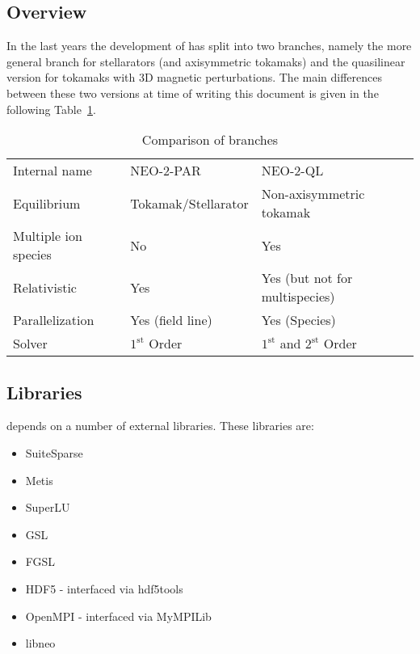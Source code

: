 \documentclass{article}
\newcommand{\vv}[1]{\texttt{\detokenize{#1}}}
\begin{document}
\subsection{Overview}
In the last years the development of \vv{NEO-2} has split into two branches,
namely the more general branch for stellarators (and axisymmetric
tokamaks) and the quasilinear version for tokamaks with 3D magnetic
perturbations. The main differences between these two versions at time
of writing this document is given in the following Table~\ref{tab:neo2branches}.

\begin{table}[h]
\centering
\begin{tabular}{lll}
Internal name   & NEO-2-PAR & NEO-2-QL\\
Equilibrium     & Tokamak/Stellarator & Non-axisymmetric tokamak\\
Multiple ion species & No & Yes\\
Relativistic    & Yes & Yes (but not for multispecies)\\
Parallelization & Yes (field line) & Yes (Species)\\
Solver          & $1^\mathrm{st}$ Order & $1^\mathrm{st}$ and $2^\mathrm{st}$ Order%
\end{tabular}
\caption{Comparison of \vv{NEO-2} branches}
\label{tab:neo2branches}
\end{table}

\subsection{Libraries\label{technicalbackground_libraries}}
\vv{NEO-2} depends on a number of external libraries. These libraries
are:
\begin{itemize}
\item SuiteSparse
\item Metis
\item SuperLU
\item GSL
\item FGSL
\item HDF5 - interfaced via hdf5tools
\item OpenMPI - interfaced via MyMPILib
\item libneo
\end{itemize}
\end{document}
